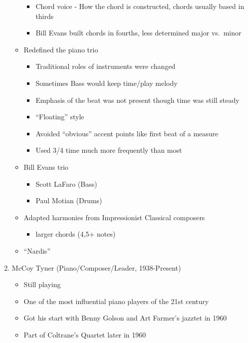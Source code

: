\documentclass[]{article}
\providecommand{\tightlist}{%
  \setlength{\itemsep}{0pt}\setlength{\parskip}{0pt}}
\begin{document}
\begin{enumerate}
\begin{itemize}
    \begin{itemize}
    \tightlist
    \item
      Chord voice - How the chord is constructed, chords usually based
      in thirds
    \item
      Bill Evans built chords in fourths, less determined major
      vs.~minor
    \end{itemize}
  \item
    Redefined the piano trio

    \begin{itemize}
    \tightlist
    \item
      Traditional roles of instruments were changed
    \item
      Sometimes Bass would keep time/play melody
    \item
      Emphasis of the beat was not present though time was still steady
    \item
      ``Floating'' style
    \item
      Avoided ``obvious'' accent points like first beat of a measure
    \item
      Used 3/4 time much more frequently than most
    \end{itemize}
  \item
    Bill Evans trio

    \begin{itemize}
    \tightlist
    \item
      Scott LaFaro (Bass)
    \item
      Paul Motian (Drums)
    \end{itemize}
  \item
    Adapted harmonies from Impressionist Classical composers

    \begin{itemize}
    \tightlist
    \item
      larger chords (4,5+ notes)
    \end{itemize}
  \item
    ``Nardis''
  \end{itemize}
\item
  McCoy Tyner (Piano/Composer/Leader, 1938-Present)

  \begin{itemize}
  \tightlist
  \item
    Still playing
  \item
    One of the most influential piano players of the 21st century
  \item
    Got his start with Benny Golson and Art Farmer's jazztet in 1960
  \item
    Part of Coltrane's Quartet later in 1960


\end{itemize}
\end{enumerate}
\end{document}
